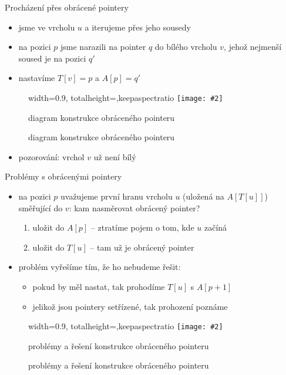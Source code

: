 \documentclass[czech]{beamer}
\makeatletter
\newcommand{\fitimage}[2][\@nil]{
	\begin{figure}
		\begin{adjustbox}{width=0.9\textwidth, totalheight=\textheight-2\baselineskip-2\baselineskip,keepaspectratio}
			\texttt{[image: \#2]}
		\end{adjustbox}
		\def\tmp{#1}%
	 \ifx\tmp\@nnil
			\else
			\caption{#1}
		\fi
	\end{figure}
}
\makeatother
\begin{document}
	\begin{frame}{Procházení přes obrácené pointery}
		\begin{itemize}
			\item jsme ve vrcholu $u$ a iterujeme přes jeho sousedy
			\item na pozici $p$ jsme narazili na pointer $q$ do bílého vrcholu $v$, jehož nejmenší soused je na pozici $q'$
			\item nastavíme $T[v] = p$ a $A[p] = q'$
		\end{itemize}
		\fitimage[diagram konstrukce obráceného pointeru]{images/deg2.png}
		\begin{itemize}
			\item pozorování: vrchol $v$ už není bílý
		\end{itemize}
	\end{frame}

	\begin{frame}{Problémy s obrácenými pointery}
		\begin{itemize}
			\item na pozici $p$ uvažujeme první hranu vrcholu $u$ (uložená na $A[T[u]]$) směřující do $v$: kam nasměrovat obrácený pointer?
			\begin{enumerate}
				\item uložit do $A[p]$ -- ztratíme pojem o tom, kde $u$ začíná
				\item uložit do $T[u]$ -- tam už je obrácený pointer
			\end{enumerate}
			\item problém vyřešíme tím, že ho nebudeme řešit:
			\begin{itemize}
				\item pokud by měl nastat, tak prohodíme $T[u]$ s $A[p + 1]$
				\item jelikož jsou pointery setřízené, tak prohození poznáme
			\end{itemize}
			\vfill
		\end{itemize}
		\fitimage[problémy a řešení konstrukce obráceného pointeru]{images/reverse-pointer-problems.png}
	\end{frame}
\end{document}
